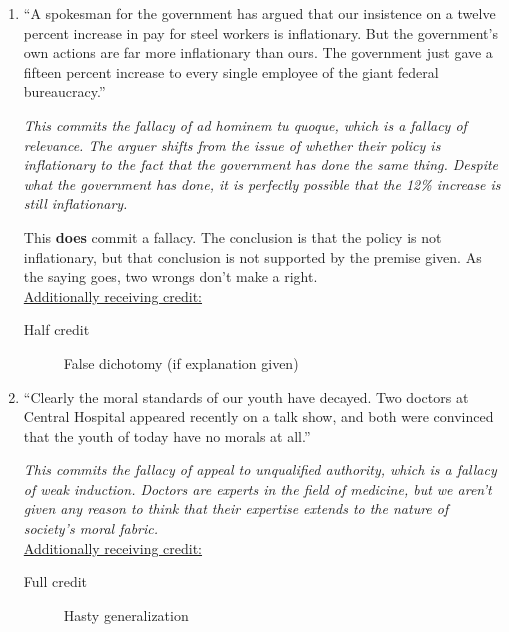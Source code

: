 \documentclass[10pt]{article}
\begin{document}
\begin{enumerate}
  
  \item ``A spokesman for the government has argued that our insistence on a twelve percent increase in pay for steel workers is inflationary. But the government's own actions are far more inflationary than ours. The government just gave a fifteen percent increase to every single employee of the giant federal bureaucracy.''
  
\textit{This commits the fallacy of ad hominem tu quoque, which is a fallacy of relevance.  The arguer shifts from the issue of whether their policy is inflationary to the fact that the government has done the same thing.  Despite what the government has done, it is perfectly possible that the 12\% increase is still inflationary.}

This \textbf{does} commit a fallacy.  The conclusion is that the policy is not inflationary, but that conclusion is not supported by the premise given.  As the saying goes, two wrongs don't make a right.
   \\
   
  \underline{Additionally receiving credit:} 
 \begin{description}
  \item [Half credit] False dichotomy (if explanation given)
 \end{description}
 
  \item ``Clearly the moral standards of our youth have decayed. Two doctors at Central Hospital appeared recently on a talk show, and both were convinced that the youth of today have no morals at all.''
  
\textit{This commits the fallacy of appeal to unqualified authority, which is a fallacy of weak induction.  Doctors are experts in the field of medicine, but we aren't given any reason to think that their expertise extends to the nature of society's moral fabric.}
\\
  
  \underline{Additionally receiving credit:} 
 \begin{description}
  \item [Full credit] Hasty generalization
 \end{description}
  

\end{enumerate}
\end{document}
